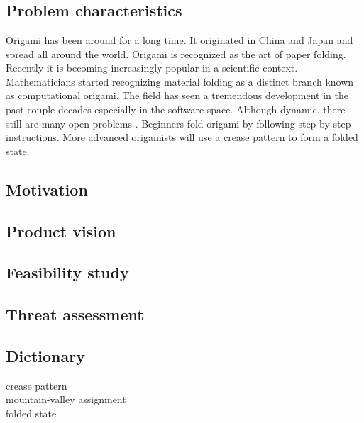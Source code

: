 \documentclass[english,12pt]{aghthesis}
\author{Antoni Mleczko \\ Maciej Mionskowski}
\date{\the\year}
\begin{document}
\maketitle

\section{\SectionTitleProjectVision}
\label{sec:cel-wizja}
\subsection{Problem characteristics}
Origami has been around for a long time. It originated in China and Japan and spread all around the world. Origami is recognized as the art of paper folding. Recently it is becoming increasingly popular in a scientific context. Mathematicians started recognizing material folding as a distinct branch known as computational origami. The field has seen a tremendous development in the past couple decades especially in the software space. Although dynamic, there still are many open problems \cite{mit-open-problems}. Beginners fold origami by following step-by-step instructions. More advanced origamists will use a crease pattern to form a folded state. 
\begin{figure}
\end{figure}

\subsection{Motivation}
\subsection{Product vision}
\subsection{Feasibility study}
\subsection{Threat assessment}
\subsection{Dictionary}
\begin{description}
	\item[crease pattern]
	\item[mountain-valley assignment]
	\item[folded state]
\end{description}
\end{document}
